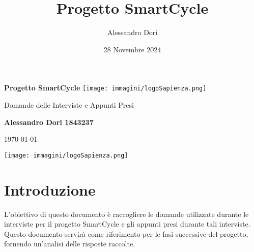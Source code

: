\documentclass[a4paper,12pt]{article}
\title{Progetto SmartCycle}
\author{Alessandro Dori}
\date{28 Novembre 2024}
\begin{document}
\begin{titlepage}
    \centering
    \vspace*{2cm}
    
    \Huge
    \textbf{Progetto SmartCycle}
    \texttt{[image: immagini/logoSapienza.png]}
    
    \vspace{1.5cm}
    
    \LARGE
    Domande delle Interviste e Appunti Presi
    
    \Large
    \textbf{Alessandro Dori 1843237}
    
    \vspace{0.8cm}
    
    \Large
    \today
    
    \vspace{2cm}
    
    \texttt{[image: immagini/logoSapienza.png]}
    
\end{titlepage}

\tableofcontents
\newpage

\section{Introduzione}
L'obiettivo di questo documento è raccogliere le domande utilizzate durante le interviste per il progetto SmartCycle e gli appunti presi durante tali interviste.
Questo documento servirà come riferimento per le fasi successive del progetto, fornendo un'analisi delle risposte raccolte.
\end{document}
